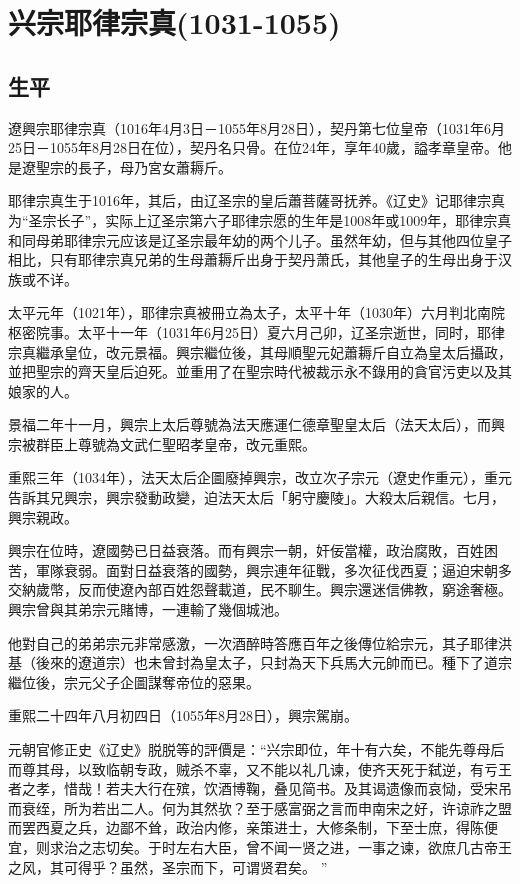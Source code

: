 
\section{兴宗耶律宗真\tiny(1031-1055)}

\subsection{生平}

遼興宗耶律宗真（1016年4月3日－1055年8月28日），契丹第七位皇帝（1031年6月25日－1055年8月28日在位），契丹名只骨。在位24年，享年40歲，謚孝章皇帝。他是遼聖宗的長子，母乃宮女蕭耨斤。

耶律宗真生于1016年，其后，由辽圣宗的皇后蕭菩薩哥抚养。《辽史》记耶律宗真为“圣宗长子”，实际上辽圣宗第六子耶律宗愿的生年是1008年或1009年，耶律宗真和同母弟耶律宗元应该是辽圣宗最年幼的两个儿子。虽然年幼，但与其他四位皇子相比，只有耶律宗真兄弟的生母蕭耨斤出身于契丹萧氏，其他皇子的生母出身于汉族或不详。

太平元年（1021年），耶律宗真被冊立為太子，太平十年（1030年）六月判北南院枢密院事。太平十一年（1031年6月25日）夏六月己卯，辽圣宗逝世，同时，耶律宗真繼承皇位，改元景福。興宗繼位後，其母順聖元妃蕭耨斤自立為皇太后攝政，並把聖宗的齊天皇后迫死。並重用了在聖宗時代被裁示永不錄用的貪官污吏以及其娘家的人。

景福二年十一月，興宗上太后尊號為法天應運仁德章聖皇太后（法天太后），而興宗被群臣上尊號為文武仁聖昭孝皇帝，改元重熙。

重熙三年（1034年），法天太后企圖廢掉興宗，改立次子宗元（遼史作重元），重元告訴其兄興宗，興宗發動政變，迫法天太后「躬守慶陵」。大殺太后親信。七月，興宗親政。

興宗在位時，遼國勢已日益衰落。而有興宗一朝，奸佞當權，政治腐敗，百姓困苦，軍隊衰弱。面對日益衰落的國勢，興宗連年征戰，多次征伐西夏；逼迫宋朝多交納歲幣，反而使遼內部百姓怨聲載道，民不聊生。興宗還迷信佛教，窮途奢極。興宗曾與其弟宗元賭博，一連輸了幾個城池。

他對自己的弟弟宗元非常感激，一次酒醉時答應百年之後傳位給宗元，其子耶律洪基（後來的遼道宗）也未曾封為皇太子，只封為天下兵馬大元帥而已。種下了道宗繼位後，宗元父子企圖謀奪帝位的惡果。

重熙二十四年八月初四日（1055年8月28日），興宗駕崩。

元朝官修正史《辽史》脱脱等的評價是：“兴宗即位，年十有六矣，不能先尊母后而尊其母，以致临朝专政，贼杀不辜，又不能以礼几谏，使齐天死于弑逆，有亏王者之孝，惜哉！若夫大行在殡，饮酒博鞠，叠见简书。及其谒遗像而哀恸，受宋吊而衰绖，所为若出二人。何为其然欤？至于感富弼之言而申南宋之好，许谅祚之盟而罢西夏之兵，边鄙不耸，政治内修，亲策进士，大修条制，下至士庶，得陈便宜，则求治之志切矣。于时左右大臣，曾不闻一贤之进，一事之谏，欲庶几古帝王之风，其可得乎？虽然，圣宗而下，可谓贤君矣。 ”


